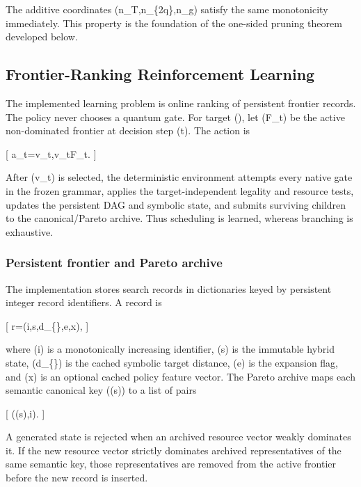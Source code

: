 \documentclass[
]{article}
\begin{document}
The additive coordinates (n\_T,n\_\{2q\},n\_g) satisfy the same
monotonicity immediately. This property is the foundation of the
one-sided pruning theorem developed below.

\hypertarget{frontier-ranking-reinforcement-learning}{%
\subsection{Frontier-Ranking Reinforcement
Learning}\label{frontier-ranking-reinforcement-learning}}

The implemented learning problem is online ranking of persistent
frontier records. The policy never chooses a quantum gate. For target
(\xi), let (\mathcal F\_t) be the active non-dominated frontier at
decision step (t). The action is

{[} a\_t=v\_t,\qquad v\_t\in\mathcal F\_t.  {]}

After (v\_t) is selected, the deterministic environment attempts every
native gate in the frozen grammar, applies the target-independent
legality and resource tests, updates the persistent DAG and symbolic
state, and submits surviving children to the canonical/Pareto archive.
Thus scheduling is learned, whereas branching is exhaustive.

\hypertarget{persistent-frontier-and-pareto-archive}{%
\subsubsection{Persistent frontier and Pareto
archive}\label{persistent-frontier-and-pareto-archive}}

The implementation stores search records in dictionaries keyed by
persistent integer record identifiers. A record is

{[} r=(i,s,d\_\{\},e,\mathbf x),  {]}

where (i) is a monotonically increasing identifier, (s) is the immutable
hybrid state, (d\_\{\}) is the cached symbolic target
distance, (e) is the expansion flag, and (\mathbf x) is an optional
cached policy feature vector. The Pareto archive maps each semantic
canonical key (\kappa(s)) to a list of pairs

{[} (\boldsymbol\rho(s),i).  {]}

A generated state is rejected when an archived resource vector weakly
dominates it. If the new resource vector strictly dominates archived
representatives of the same semantic key, those representatives are
removed from the active frontier before the new record is inserted.
\end{document}
